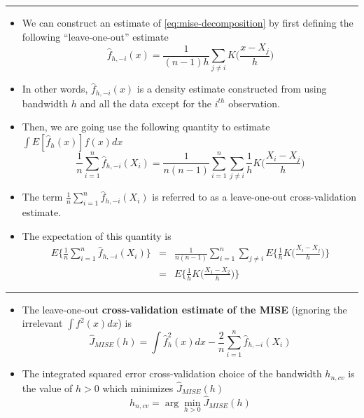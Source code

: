\documentclass[]{book}
\begin{document}
\begin{center}\rule{0.5\linewidth}{\linethickness}\end{center}

\begin{itemize}
\item
  We can construct an estimate of \eqref{eq:mise-decomposition} by first defining the
  following ``leave-one-out'' estimate
  \begin{equation}
  \hat{f}_{h, -i}(x) = \frac{1}{(n-1)h}\sum_{j \neq i}  K\Big( \frac{x - X_{j}}{h} \Big) 
  \end{equation}
\item
  In other words, \(\hat{f}_{h, -i}(x)\) is a density estimate constructed from using
  bandwidth \(h\) and all the data except for the \(i^{th}\) observation.
\item
  Then, we are going use the following quantity to estimate \(\int E[ \hat{f}_{h}(x) ] f(x) dx\)
  \begin{equation}
  \frac{1}{n} \sum_{i=1}^{n} \hat{f}_{h, -i}( X_{i} ) 
  = \frac{1}{n(n-1)} \sum_{i=1}^{n} \sum_{j \neq i} \frac{1}{h}K\Big( \frac{X_{i} - X_{j}}{ h } \Big) \nonumber 
  \end{equation}
\item
  The term \(\frac{1}{n} \sum_{i=1}^{n} \hat{f}_{h, -i}( X_{i} )\) is referred to as a leave-one-out cross-validation
  estimate.
\item
  The expectation of this quantity is
  \begin{eqnarray}
  E\Big\{ \frac{1}{n} \sum_{i=1}^{n} \hat{f}_{h, -i}( X_{i} )  \Big\}
  &=& \frac{1}{n(n-1)}\sum_{i=1}^{n} \sum_{j \neq i} E\Big\{ \frac{1}{h}  K\Big( \frac{X_{i} - X_{j}}{ h } \Big)  \Big\}  \nonumber \\
  &=& E\Big\{ \frac{1}{h}  K\Big( \frac{X_{1} - X_{2}}{ h } \Big)  \Big\} \nonumber
  \end{eqnarray}
\end{itemize}

\begin{center}\rule{0.5\linewidth}{\linethickness}\end{center}

\begin{itemize}
\item
  The leave-one-out \textbf{cross-validation estimate of the MISE} (ignoring the irrelevant \(\int f^{2}(x) dx\)) is
  \begin{equation}
  \hat{J}_{MISE}(h) = \int \hat{f}_{h}^{2}(x) dx - \frac{2}{n} \sum_{i=1}^{n} \hat{f}_{h, -i}( X_{i} )  \nonumber
  \end{equation}
\item
  The integrated squared error cross-validation choice of the bandwidth \(h_{n,cv}\) is the value of \(h > 0\) which minimizes \(\hat{J}_{MISE}(h)\)
  \begin{equation}
  h_{n,cv} = \arg\min_{h > 0} \hat{J}_{MISE}(h) \nonumber
  \end{equation}
\end{itemize}
\end{document}
